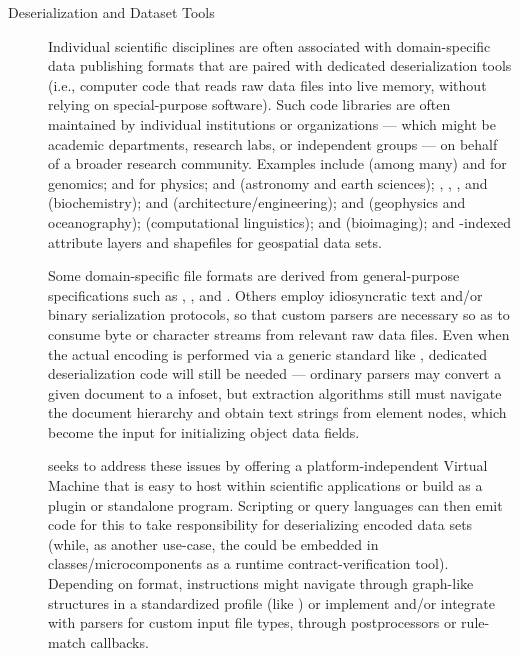 \documentclass[11pt]{article}
\begin{document}
{{\begin{description}
\item[Deserialization and Dataset Tools]  Individual scientific disciplines are often 
associated with domain-specific data publishing formats that are paired with 
dedicated deserialization tools (i.e., computer code that 
reads raw data files into live memory, without relying on special-purpose 
software).  Such code libraries are often maintained by individual 
institutions or organizations --- which might be academic departments, research 
labs, or independent groups --- on behalf of a 
broader research community.  Examples include (among many) \FASTQ{} and \VCF{} for genomics; \HDFfive{} and \ROOT{} for physics; 
\FITS{} and \netCDF{} (astronomy and earth sciences); \PDB{}, \MOL{}, 
\SBML{}, and \CELLML{} (biochemistry); 
\IFC{} and \BIM{} (architecture/engineering); \SEGY{} and \BAG{} 
(geophysics and oceanography); \CoNLLU{} (computational linguistics); 
\DICOM{} and \OMETIFF{} (bioimaging); and \GIS{}-indexed attribute layers 
and shapefiles for geospatial data sets.

\pseudoIndent{} Some domain-specific file formats are derived from general-purpose 
specifications such as \XML{}, \CSV{}, and \JSON{}.  Others 
employ idiosyncratic text and/or binary 
serialization protocols, so that custom parsers are necessary so as to consume byte or character 
streams from relevant raw data files.  Even when the actual encoding is performed via a 
generic standard like \XML{}, dedicated deserialization code will still be needed --- 
ordinary parsers may convert a given \XML{} document to a %
\DOM{} infoset, but extraction algorithms 
still must navigate the document hierarchy and obtain 
text strings from element nodes, which become the input for initializing 
object data fields.

\pseudoIndent{} \lPacTk{} seeks to address these issues by offering a 
platform-independent Virtual Machine that is easy to host within 
scientific applications or build as a plugin or standalone program.  
Scripting 
or query languages can then emit code for this \VM{} to 
take responsibility for deserializing encoded data sets 
(while, as another use-case, the \VM{} could be embedded in 
\Cpp{} classes/microcomponents   
as a runtime contract-verification tool).  Depending 
on format, \VM{} instructions might navigate through 
graph-like structures in a standardized profile (like \XML{}) 
or implement and/or integrate with parsers for custom input file types, 
through postprocessors or rule-match callbacks.  


\end{description}}}
\end{document}
